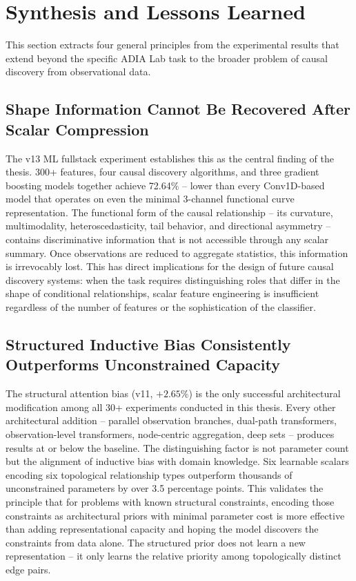 \section{Synthesis and Lessons Learned}
\label{sec:lessons}

This section extracts four general principles from the experimental results that extend beyond the specific ADIA Lab task to the broader problem of causal discovery from observational data.

\subsection{Shape Information Cannot Be Recovered After Scalar Compression}

The v13 ML fullstack experiment establishes this as the central finding of the thesis. 300+ features, four causal discovery algorithms, and three gradient boosting models together achieve 72.64\% -- lower than every Conv1D-based model that operates on even the minimal 3-channel functional curve representation. The functional form of the causal relationship -- its curvature, multimodality, heteroscedasticity, tail behavior, and directional asymmetry -- contains discriminative information that is not accessible through any scalar summary. Once observations are reduced to aggregate statistics, this information is irrevocably lost. This has direct implications for the design of future causal discovery systems: when the task requires distinguishing roles that differ in the shape of conditional relationships, scalar feature engineering is insufficient regardless of the number of features or the sophistication of the classifier.

\subsection{Structured Inductive Bias Consistently Outperforms Unconstrained Capacity}

The structural attention bias (v11, $+2.65\%$) is the only successful architectural modification among all 30+ experiments conducted in this thesis. Every other architectural addition -- parallel observation branches, dual-path transformers, observation-level transformers, node-centric aggregation, deep sets -- produces results at or below the baseline. The distinguishing factor is not parameter count but the alignment of inductive bias with domain knowledge. Six learnable scalars encoding six topological relationship types outperform thousands of unconstrained parameters by over 3.5 percentage points. This validates the principle that for problems with known structural constraints, encoding those constraints as architectural priors with minimal parameter cost is more effective than adding representational capacity and hoping the model discovers the constraints from data alone. The structured prior does not learn a new representation -- it only learns the relative priority among topologically distinct edge pairs.

